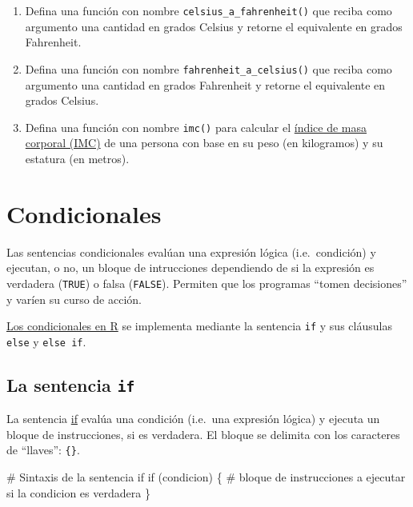 \documentclass[
  letterpaper,
  DIV=11,
  numbers=noendperiod]{scrreprt}
\newenvironment{Shaded}{\begin{snugshade}}{\end{snugshade}}
\newcommand{\CommentTok}[1]{\textcolor[rgb]{0.37,0.37,0.37}{#1}}
\newcommand{\ControlFlowTok}[1]{\textcolor[rgb]{0.00,0.23,0.31}{#1}}
\newcommand{\NormalTok}[1]{\textcolor[rgb]{0.00,0.23,0.31}{#1}}
\providecommand{\tightlist}{%
  \setlength{\itemsep}{0pt}\setlength{\parskip}{0pt}}\usepackage{longtable,booktabs,array}
\begin{document}
\begin{enumerate}
\def\labelenumi{\arabic{enumi}.}
\tightlist
\item
  Defina una función con nombre \texttt{celsius\_a\_fahrenheit()} que
  reciba como argumento una cantidad en grados Celsius y retorne el
  equivalente en grados Fahrenheit.\\
\item
  Defina una función con nombre \texttt{fahrenheit\_a\_celsius()} que
  reciba como argumento una cantidad en grados Fahrenheit y retorne el
  equivalente en grados Celsius.\\
\item
  Defina una función con nombre \texttt{imc()} para calcular el
  \href{https://es.wikipedia.org/wiki/\%C3\%8Dndice_de_masa_corporal}{índice
  de masa corporal (IMC)} de una persona con base en su peso (en
  kilogramos) y su estatura (en metros).
\end{enumerate}

\hypertarget{condicionales}{%
\section{Condicionales}\label{condicionales}}

Las sentencias condicionales evalúan una expresión lógica
(i.e.~condición) y ejecutan, o no, un bloque de intrucciones dependiendo
de si la expresión es verdadera (\texttt{TRUE}) o falsa
(\texttt{FALSE}). Permiten que los programas ``tomen decisiones'' y
varíen su curso de acción.

\href{https://cran.r-project.org/doc/manuals/r-devel/R-lang.html\#if}{Los
condicionales en R} se implementa mediante la sentencia \texttt{if} y
sus cláusulas \texttt{else} y \texttt{else\ if}.

\hypertarget{la-sentencia-if}{%
\subsection{\texorpdfstring{La sentencia
\texttt{if}}{La sentencia if}}\label{la-sentencia-if}}

La sentencia
\href{https://cran.r-project.org/doc/manuals/r-devel/R-lang.html\#if}{if}
evalúa una condición (i.e.~una expresión lógica) y ejecuta un bloque de
instrucciones, si es verdadera. El bloque se delimita con los caracteres
de ``llaves'': \texttt{\{\}}.

\begin{Shaded}
\begin{Highlighting}[]
\CommentTok{\# Sintaxis de la sentencia if}
\ControlFlowTok{if}\NormalTok{ (condicion) \{}
  \CommentTok{\# bloque de instrucciones a ejecutar si la condicion es verdadera}
\NormalTok{\}}
\end{Highlighting}
\end{Shaded}
\end{document}
